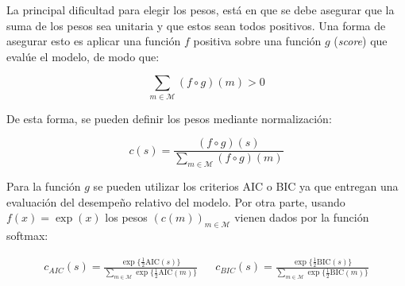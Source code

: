 La principal dificultad para elegir los pesos, está en que se debe asegurar que la suma de los pesos sea unitaria y que estos sean todos positivos. Una forma de asegurar esto es aplicar una función $f$ positiva sobre una función $g$ (\emph{score}) que evalúe el modelo, de modo que:

\begin{equation}
\sum_{m\in \mathcal{M}} (f\circ g)(m) > 0
\end{equation}

De esta forma, se pueden definir los pesos mediante normalización:

\begin{equation}
c(s) = \frac{(f\circ g)(s)}{\sum_{m\in \mathcal{M}} (f\circ g)(m)}
\end{equation}

Para la función $g$ se pueden utilizar los criterios AIC o BIC ya que entregan una evaluación del desempeño relativo del modelo. Por otra parte, usando $f(x)=\exp(x)$ los pesos $\left(c(m)\right)_{m\in\mathcal{M}}$ vienen dados por la función softmax:



\begin{align}
c_{AIC}(s) = \frac{\exp\{ \frac{1}{2} \text{AIC}(s)\}}{\sum_{m\in \mathcal{M}} \exp\{ \frac{1}{2} \text{AIC}(m)\}} & & c_{BIC}(s) = \frac{\exp\{ \frac{1}{2} \text{BIC}(s)\}}{\sum_{m\in \mathcal{M}} \exp\{ \frac{1}{2} \text{BIC}(m)\}}
\end{align}
